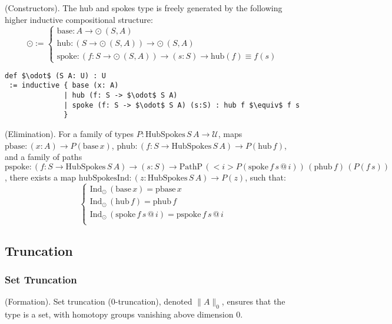 \documentclass{article}
\begin{document}
\begin{definition} (Constructors).
The hub and spokes type is freely generated by the following higher inductive compositional structure:
\[
\odot :=
\begin{cases}
\text{base} : A \to \odot\ (S,A) \\
\text{hub} : (S \to \odot\ (S,A)) \to \odot\ (S,A) \\
\text{spoke} : (f : S \to \odot\ (S,A)) \to (s : S) \to \text{hub}(f) \equiv f(s)
\end{cases}
\]
\begin{lstlisting}[mathescape=true]
def $\odot$ (S A: U) : U
 := inductive { base (x: A)
              | hub (f: S -> $\odot$ S A)
              | spoke (f: S -> $\odot$ S A) (s:S) : hub f $\equiv$ f s
              }
\end{lstlisting}
\end{definition}

\begin{theorem} (Elimination).
For a family of types \( P : \text{HubSpokes} \, S \, A \to \mathcal{U} \),
maps \( \text{pbase} : (x : A) \to P(\text{base} \, x) \),
\( \text{phub} : (f : S \to \text{HubSpokes} \, S \, A) \to P(\text{hub} \, f) \),
and a family of paths
\( \text{pspoke} : (f : S \to \text{HubSpokes} \, S \, A) \to (s : S) \to \text{PathP} \, (<i> P(\text{spoke} \, f \, s \, @ \, i)) \, (\text{phub} \, f) \, (P(f \, s)) \),
there exists a map \( \text{hubSpokesInd} : (z : \text{HubSpokes} \, S \, A) \to P(z) \), such that:
\[
\begin{cases}
\text{Ind}_\odot \, (\text{base} \, x) = \text{pbase} \, x \\
\text{Ind}_\odot \, (\text{hub} \, f) = \text{phub} \, f \\
\text{Ind}_\odot \, (\text{spoke} \, f \, s \, @ \, i) = \text{pspoke} \, f \, s \, @ \, i \\
\end{cases}
\]
\end{theorem}

\newpage
\subsection{Truncation}
\subsubsection*{Set Truncation}
\begin{definition} (Formation).
Set truncation (0-truncation), denoted \( \| A \|_0 \),
ensures that the type is a set, with homotopy groups vanishing above dimension 0.
\end{definition}
\end{document}
